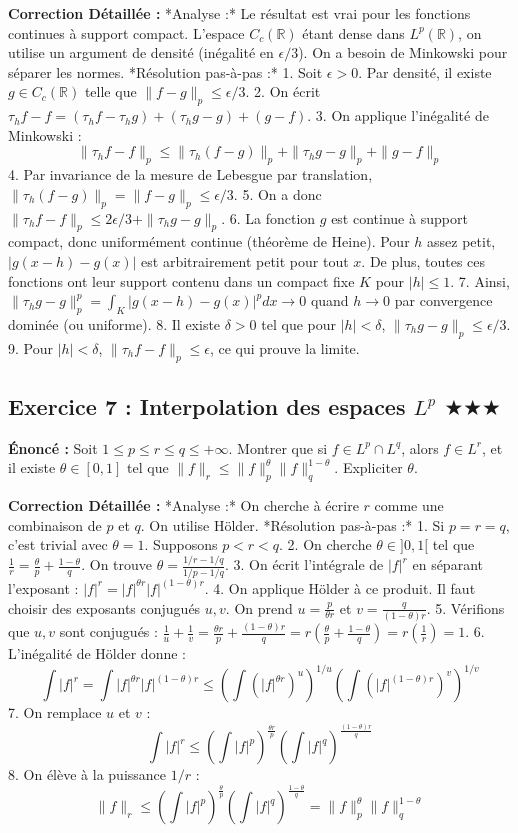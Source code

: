 \documentclass[11pt,a4paper]{article}
\begin{document}
\textbf{Correction Détaillée :}
*Analyse :* Le résultat est vrai pour les fonctions continues à support compact. L'espace $C_c(\mathbb{R})$ étant dense dans $L^p(\mathbb{R})$, on utilise un argument de densité (inégalité en $\epsilon/3$). On a besoin de Minkowski pour séparer les normes.
*Résolution pas-à-pas :*
1. Soit $\epsilon > 0$. Par densité, il existe $g \in C_c(\mathbb{R})$ telle que $\|f - g\|_p \le \epsilon/3$.
2. On écrit $\tau_h f - f = (\tau_h f - \tau_h g) + (\tau_h g - g) + (g - f)$.
3. On applique l'inégalité de Minkowski :
   $$\|\tau_h f - f\|_p \le \|\tau_h (f - g)\|_p + \|\tau_h g - g\|_p + \|g - f\|_p$$
4. Par invariance de la mesure de Lebesgue par translation, $\|\tau_h (f - g)\|_p = \|f - g\|_p \le \epsilon/3$.
5. On a donc $\|\tau_h f - f\|_p \le 2\epsilon/3 + \|\tau_h g - g\|_p$.
6. La fonction $g$ est continue à support compact, donc uniformément continue (théorème de Heine). Pour $h$ assez petit, $|g(x-h) - g(x)|$ est arbitrairement petit pour tout $x$. De plus, toutes ces fonctions ont leur support contenu dans un compact fixe $K$ pour $|h| \le 1$.
7. Ainsi, $\|\tau_h g - g\|_p^p = \int_K |g(x-h) - g(x)|^p dx \to 0$ quand $h \to 0$ par convergence dominée (ou uniforme).
8. Il existe $\delta > 0$ tel que pour $|h| < \delta$, $\|\tau_h g - g\|_p \le \epsilon/3$.
9. Pour $|h| < \delta$, $\|\tau_h f - f\|_p \le \epsilon$, ce qui prouve la limite.


\subsection*{Exercice 7 : Interpolation des espaces $L^p$ $\bigstar\bigstar\bigstar$}

\textbf{Énoncé :} Soit $1 \le p \le r \le q \le +\infty$. Montrer que si $f \in L^p \cap L^q$, alors $f \in L^r$, et il existe $\theta \in [0, 1]$ tel que $\|f\|_r \le \|f\|_p^\theta \|f\|_q^{1-\theta}$. Expliciter $\theta$.

\textbf{Correction Détaillée :}
*Analyse :* On cherche à écrire $r$ comme une combinaison de $p$ et $q$. On utilise Hölder.
*Résolution pas-à-pas :*
1. Si $p=r=q$, c'est trivial avec $\theta = 1$. Supposons $p < r < q$.
2. On cherche $\theta \in ]0, 1[$ tel que $\frac{1}{r} = \frac{\theta}{p} + \frac{1-\theta}{q}$. On trouve $\theta = \frac{1/r - 1/q}{1/p - 1/q}$.
3. On écrit l'intégrale de $|f|^r$ en séparant l'exposant : $|f|^r = |f|^{\theta r} |f|^{(1-\theta)r}$.
4. On applique Hölder à ce produit. Il faut choisir des exposants conjugués $u, v$. On prend $u = \frac{p}{\theta r}$ et $v = \frac{q}{(1-\theta)r}$.
5. Vérifions que $u, v$ sont conjugués : $\frac{1}{u} + \frac{1}{v} = \frac{\theta r}{p} + \frac{(1-\theta)r}{q} = r(\frac{\theta}{p} + \frac{1-\theta}{q}) = r(\frac{1}{r}) = 1$.
6. L'inégalité de Hölder donne :
   $$\int |f|^r = \int |f|^{\theta r} |f|^{(1-\theta)r} \le \left( \int (|f|^{\theta r})^u \right)^{1/u} \left( \int (|f|^{(1-\theta)r})^v \right)^{1/v}$$
7. On remplace $u$ et $v$ :
   $$\int |f|^r \le \left( \int |f|^p \right)^{\frac{\theta r}{p}} \left( \int |f|^q \right)^{\frac{(1-\theta)r}{q}}$$
8. On élève à la puissance $1/r$ :
   $$\|f\|_r \le \left( \int |f|^p \right)^{\frac{\theta}{p}} \left( \int |f|^q \right)^{\frac{1-\theta}{q}} = \|f\|_p^\theta \|f\|_q^{1-\theta}$$
\end{document}
